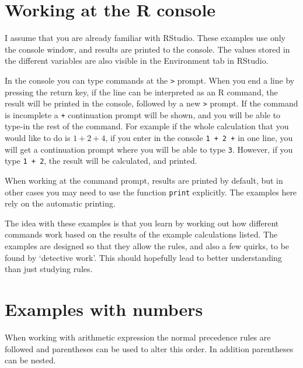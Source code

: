 \documentclass[paper=a4,10pt,div=17,headsepline,BCOR=12mm,twoside,open=right]{scrbook}\usepackage{knitr}
\begin{document}
\section{Working at the R console}

I assume that you are already familiar with RStudio. These examples use only the console window, and results are printed to the console. The values stored in the different variables are also visible in the Environment tab in RStudio.

In the console you can type commands at the \texttt{>} prompt.
When you end a line by pressing the return key, if the line can be interpreted as an R command, the result will be printed in the console, followed by a new \texttt{>} prompt.
If the command is incomplete a \texttt{+} continuation prompt will be shown, and you will be able to type-in the rest of the command. For example if the whole calculation that you would like to do is $1 + 2 + 4$, if you enter in the console \texttt{1 + 2 +} in one line, you will get a continuation prompt where you will be able to type \texttt{3}. However, if you type \texttt{1 + 2}, the result will be calculated, and printed.

When working at the command prompt, results are printed by default, but in other cases you may need to use the function \texttt{print} explicitly. The examples here rely on the automatic printing.

The idea with these examples is that you learn by working out how different commands work based on the results of the example calculations listed. The examples are designed so that they allow the rules, and also a few quirks, to be found by `detective work'. This should hopefully lead to better understanding than just studying rules.

\section{Examples with numbers}

When working with arithmetic expression the normal precedence rules are followed and parentheses can be used to alter this order. In addition parentheses can be nested.
\end{document}
